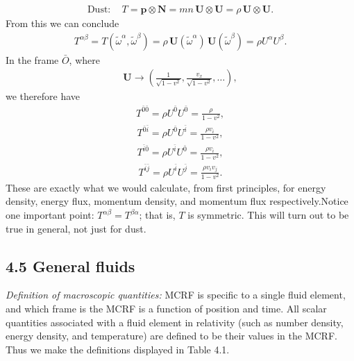 \documentclass[11pt,letterpaper]{book}
\begin{document}
    \begin{align}
    \text{Dust}: \quad T = \mathbf{p} \otimes \mathbf{N} = mn \, \mathbf{U} \otimes \mathbf{U} = \rho \, \mathbf{U} \otimes \mathbf{U}. \tag{4.19}
    \end{align}
    From this we can conclude
    \begin{align}
    T^{\alpha\beta} = T(\tilde{\omega}^\alpha, \tilde{\omega}^\beta) = \rho \, \mathbf{U}(\tilde{\omega}^\alpha) \, \mathbf{U}(\tilde{\omega}^\beta) = \rho U^\alpha U^\beta. \tag{4.20}
    \end{align}
    In the frame \(\bar{O}\), where
    \begin{align}
    \mathbf{U} \rightarrow \left(\frac{1}{\sqrt{1 - v^2}}, \frac{v_x}{\sqrt{1 - v^2}}, \ldots \right),
    \end{align}
    we therefore have
    \begin{align}
    T^{\bar{0}\bar{0}} = \rho U^{\bar{0}} U^{\bar{0}} = \frac{\rho}{1 - v^2},
    \end{align}
    \begin{align}
    T^{\bar{0}\bar{i}} = \rho U^{\bar{0}} U^{\bar{i}} = \frac{\rho v_i}{1 - v^2},
    \end{align}
    \begin{align}
    T^{\bar{i}\bar{0}} = \rho U^{\bar{i}} U^{\bar{0}} = \frac{\rho v_i}{1 - v^2},
    \end{align}
    \begin{align}
    T^{\bar{i}\bar{j}} = \rho U^{\bar{i}} U^{\bar{j}} = \frac{\rho v_i v_j}{1 - v^2}.
    \tag{4.21}
    \end{align}
    These are exactly what we would calculate, from first principles, for energy density, energy flux, momentum density, and momentum flux respectively.Notice one important point: \(T^{\alpha\beta} = T^{\beta\alpha}\); that is, \(T\) is symmetric. This will turn out to be true in general, not just for dust.
    
    \subsection{4.5 General fluids}

    \textit{Definition of macroscopic quantities:}
    MCRF is specific to a single fluid element, and which frame is the MCRF is a function of position and time. All scalar quantities associated with a fluid element in relativity (such as number density, energy density, and temperature) are defined to be their values in the MCRF. Thus we make the definitions displayed in Table 4.1.
\end{document}
